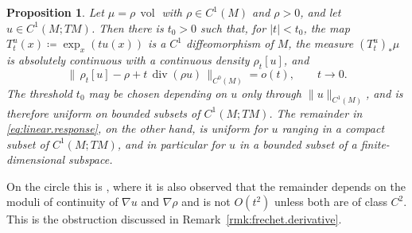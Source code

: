 \documentclass[11pt,reqno]{amsart}
\theoremstyle{plain}
\newtheorem{prp}[thm]{Proposition}
\theoremstyle{definition}
\DeclareMathOperator{\vol}{vol}
\DeclareMathOperator{\Div}{div}
\begin{document}
\begin{prp}\label{prp:linear.response}
    Let \( \mu=\rho\,\vol \) with \( \rho\in C^1(M) \) and \( \rho>0 \), and let \( u\in C^1(M;TM) \).  
    Then there is \( t_0>0 \) such that, for \( \lvert t\rvert<t_0 \), the map \( T^u_t(x)\coloneqq \exp_x(tu(x)) \) is a \( C^1 \) diffeomorphism of \( M \), the measure \( (T^u_t)_\ast\mu \) is absolutely continuous with a continuous density \( \rho_t[u] \), and
    \begin{equation}\label{eq:linear.response}
        \big\lVert\,\rho_t[u]-\rho+t\,\Div(\rho u)\,\big\rVert_{C^0(M)}=o(t),
        \qquad t\to0 .
    \end{equation}
    The threshold \( t_0 \) may be chosen depending on \( u \) only through \( \lVert u\rVert_{C^1(M)} \), and is therefore uniform on bounded subsets of \( C^1(M;TM) \).
    The remainder in \eqref{eq:linear.response}, on the other hand, is uniform for \( u \) ranging in a compact subset of \( C^1(M;TM) \), and in particular for \( u \) in a bounded subset of a finite-dimensional subspace.
\end{prp}

On the circle this is \cite[Proposition 3.2]{kloeckner_optimal_2013}, where it is also observed that the remainder depends on the moduli of continuity of \( \nabla u \) and \( \nabla\rho \) and is not \( O(t^2) \) unless both are of class \( C^2 \).
This is the obstruction discussed in Remark~\ref{rmk:frechet.derivative}.
\end{document}
